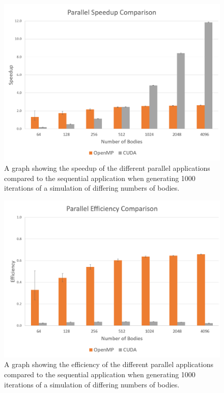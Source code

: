 \documentclass[12pt,journal,transmag]{IEEEtran}
\begin{document}
	\begin{figure}[!h]
		\centering
		\includegraphics[width=1.5\columnwidth]{IMAGES/speedupcomp}
		\caption{A graph showing the speedup of the different parallel applications compared to the sequential application when generating 1000 iterations of a simulation of differing numbers of bodies.}
		\label{graph3}
	\end{figure}
	
	\begin{figure}[!h]
		\centering
		\includegraphics[width=1.5\columnwidth]{IMAGES/effcomp}
		\caption{A graph showing the efficiency of the different parallel applications compared to the sequential application when generating 1000 iterations of a simulation of differing numbers of bodies.}
		\label{graph4}
	\end{figure}
\end{document}
